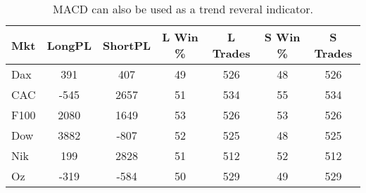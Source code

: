 \begin{table}[ht]
\centering
\caption[MACD as Trend Reversal Indicator]{MACD can also be used as a trend reveral indicator.} 
\label{tab:mac_ob_results}
\begin{tabular}{lcccccc}
  \toprule Mkt & LongPL & ShortPL & L Win \% & L Trades & S Win \% & S Trades \\ 
  \midrule Dax & 391 & 407 & 49 & 526 & 48 & 526 \\ 
  CAC & -545 & 2657 & 51 & 534 & 55 & 534 \\ 
  F100 & 2080 & 1649 & 53 & 526 & 53 & 526 \\ 
  Dow & 3882 & -807 & 52 & 525 & 48 & 525 \\ 
  Nik & 199 & 2828 & 51 & 512 & 52 & 512 \\ 
  Oz & -319 & -584 & 50 & 529 & 49 & 529 \\ 
   \bottomrule \end{tabular}
\end{table}
